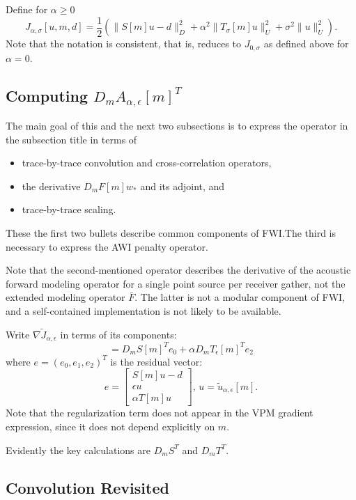 Define for $\alpha \ge 0$
\[
 J_{\alpha,\sigma}[u,m,d] = \frac{1}{2}(\|S[m]u - d\|_D^2 + \alpha^2\|T_\sigma[m]u\|_U^2 + \sigma^2 \|u\|^2_U).
\]
Note that the notation is consistent, that is, reduces to $J_{0,\sigma}$ as defined above for $\alpha=0$.


\subsection{Computing $D_mA_{\alpha,\epsilon}[m]^T$}
The main goal of this and the next two subsections is to express the
operator in the subsection title in terms of
\begin{itemize}
  \item trace-by-trace convolution and cross-correlation operators,
  \item the derivative $D_mF[m]w_*$ and its adjoint, and
  \item trace-by-trace scaling.
\end{itemize}
These the first two bullets describe common components of FWI.The
third is necessary to express the AWI penalty operator.

Note that the second-mentioned operator describes the derivative of
the acoustic forward modeling operator for a single point source per
receiver gather, not the extended modeling operator $\bar{F}$. The
latter is not a modular component of FWI, and a self-contained
implementation is not likely to be available.

Write $\nabla \tilde{J}_{\alpha,\epsilon}$ in terms of its components:
\begin{equation}
= D_mS[m]^T e_0 + \alpha D_mT_{\epsilon}[m]^Te_2
\label{eqn:tildejgrad}
\end{equation}
where $e=(e_0,e_1,e_2)^T$ is the residual vector:
$$
e = \left[
\begin{array}{c}
S[m]u-d\\
\epsilon u\\
\alpha T[m]u
\end{array}
\right],\, u=\tilde{u}_{\alpha,\epsilon}[m].
$$
Note that the regularization term does not appear in the VPM gradient expression, since it does not depend explicitly on $m$.

Evidently the key calculations are $D_mS^T$ and $D_m T^T$. 

\subsection{Convolution Revisited}

